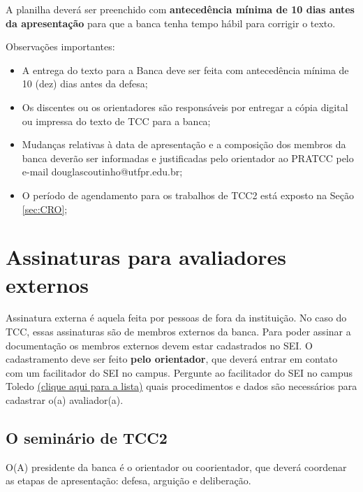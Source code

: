 \documentclass[a4paper, 12pt]{article}
\begin{document}
    A planilha deverá ser preenchido com \textbf{antecedência mínima de 10 dias antes da apresentação} para que a banca tenha tempo hábil para corrigir o texto.    
		
    Observações importantes:
    
    \begin{itemize}
    	\item A entrega do texto para a Banca deve ser feita com antecedência mínima de 10 (dez) dias antes da defesa;
    	\item Os discentes ou os orientadores são responsáveis por entregar a cópia digital ou impressa do texto de TCC para a banca;
    	\item Mudanças relativas à data de apresentação e a composição dos membros da banca deverão ser informadas e justificadas pelo orientador ao PRATCC pelo e-mail douglascoutinho@utfpr.edu.br;
    	\item O período de agendamento para os trabalhos de TCC2 está exposto na Seção \ref{sec:CRO};
    \end{itemize}

	\section{Assinaturas para avaliadores externos}
	
	Assinatura externa é aquela feita por pessoas de fora da instituição. No caso do TCC, essas assinaturas são de membros externos da banca. Para poder assinar a documentação os membros externos devem estar cadastrados no SEI. O cadastramento deve ser feito \textbf{pelo orientador}, que deverá entrar em contato com um facilitador do SEI no campus. Pergunte ao facilitador do SEI no campus Toledo \href{http://portal.utfpr.edu.br/servidores/servicos-servidor/sei/facilitadores}{(clique aqui para a lista)} quais procedimentos e dados são necessários para cadastrar o(a) avaliador(a).

	\subsection{O seminário de TCC2}
	
	O(A) presidente da banca é o orientador ou coorientador, que deverá coordenar as etapas de apresentação: defesa, arguição e deliberação. 
	
\end{document}
